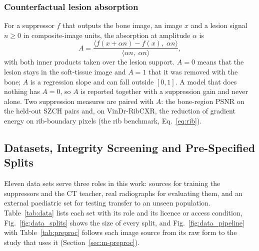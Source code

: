 \subsubsection{Counterfactual lesion absorption}
\label{sec:m-absorption}
For a suppressor $f$ that outputs the bone image, an image $x$ and a lesion signal $n\ge0$ in composite-image units, the absorption at
amplitude $\alpha$ is
\begin{equation}
A=\frac{\big\langle f(x+\alpha n)-f(x),\;\alpha n\big\rangle}{\big\langle \alpha n,\;\alpha n\big\rangle},
\label{eq:absorption}
\end{equation}
with both inner products taken over the lesion support. $A=0$ means that the lesion stays in the soft-tissue image and $A=1$ that it was
removed with the bone; $A$ is a regression slope and can fall outside $[0,1]$. A model that does nothing has $A=0$, so $A$ is reported
together with a suppression gain and never alone. Two suppression measures are paired with $A$: the bone-region PSNR on the held-out SZCH
pairs and, on VinDr-RibCXR, the reduction of gradient energy on rib-boundary pixels (the rib benchmark, Eq.~\eqref{eq:rib}).

\subsection{Datasets, Integrity Screening and Pre-Specified Splits}
\label{sec:m-data}
Eleven data sets serve three roles in this work: sources for training the suppressors and the CT teacher, real radiographs for evaluating
them, and an external paediatric set for testing transfer to an unseen population. Table~\ref{tab:data} lists each set with its role and
its licence or access condition, Fig.~\ref{fig:data_splits} shows the size of every split, and Fig.~\ref{fig:data_pipeline} with
Table~\ref{tab:preproc} follows each image source from its raw form to the study that uses it (Section~\ref{sec:m-preproc}).

